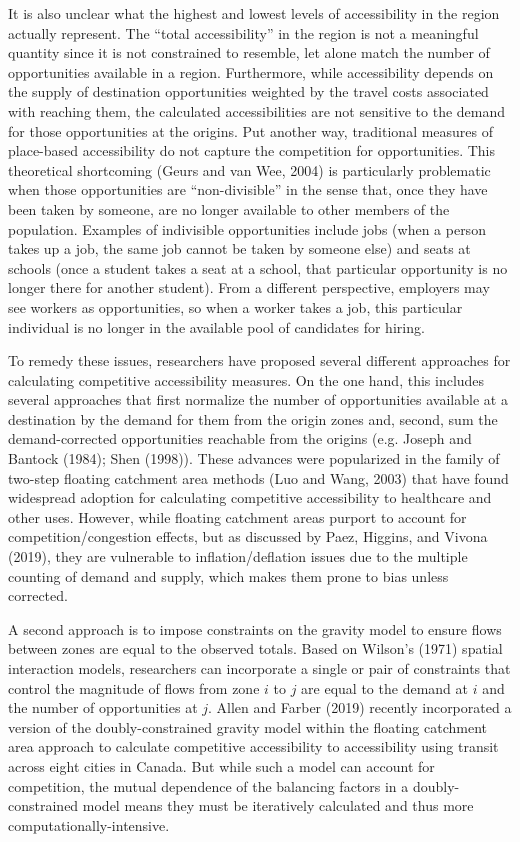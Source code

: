 \documentclass[]{elsarticle} %
\begin{document}
It is also unclear what the highest and lowest levels of accessibility
in the region actually represent. The ``total accessibility'' in the
region is not a meaningful quantity since it is not constrained to
resemble, let alone match the number of opportunities available in a
region. Furthermore, while accessibility depends on the supply of
destination opportunities weighted by the travel costs associated with
reaching them, the calculated accessibilities are not sensitive to the
demand for those opportunities at the origins. Put another way,
traditional measures of place-based accessibility do not capture the
competition for opportunities. This theoretical shortcoming (Geurs and
van Wee, 2004) is particularly problematic when those opportunities are
``non-divisible'' in the sense that, once they have been taken by
someone, are no longer available to other members of the population.
Examples of indivisible opportunities include jobs (when a person takes
up a job, the same job cannot be taken by someone else) and seats at
schools (once a student takes a seat at a school, that particular
opportunity is no longer there for another student). From a different
perspective, employers may see workers as opportunities, so when a
worker takes a job, this particular individual is no longer in the
available pool of candidates for hiring.

To remedy these issues, researchers have proposed several different
approaches for calculating competitive accessibility measures. On the
one hand, this includes several approaches that first normalize the
number of opportunities available at a destination by the demand for
them from the origin zones and, second, sum the demand-corrected
opportunities reachable from the origins (e.g. Joseph and Bantock
(1984); Shen (1998)). These advances were popularized in the family of
two-step floating catchment area methods (Luo and Wang, 2003) that have
found widespread adoption for calculating competitive accessibility to
healthcare and other uses. However, while floating catchment areas
purport to account for competition/congestion effects, but as discussed
by Paez, Higgins, and Vivona (2019), they are vulnerable to
inflation/deflation issues due to the multiple counting of demand and
supply, which makes them prone to bias unless corrected.

A second approach is to impose constraints on the gravity model to
ensure flows between zones are equal to the observed totals. Based on
Wilson's (1971) spatial interaction models, researchers can incorporate
a single or pair of constraints that control the magnitude of flows from
zone \(i\) to \(j\) are equal to the demand at \(i\) and the number of
opportunities at \(j\). Allen and Farber (2019) recently incorporated a
version of the doubly-constrained gravity model within the floating
catchment area approach to calculate competitive accessibility to
accessibility using transit across eight cities in Canada. But while
such a model can account for competition, the mutual dependence of the
balancing factors in a doubly-constrained model means they must be
iteratively calculated and thus more computationally-intensive.
\end{document}
